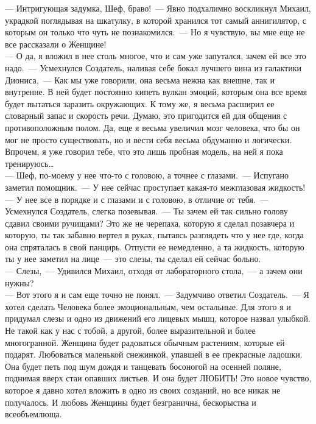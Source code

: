 --- Интригующая задумка, Шеф, браво!~--- Явно подхалимно воскликнул Михаил, 
украдкой поглядывая на шкатулку, в которой хранился тот самый 
аннигилятор, с которым он только что чуть не познакомился.~--- Но я 
чувствую, вы мне еще не все рассказали о Женщине!\\
--- О да, я вложил в нее столь многое, что и сам уже запутался, зачем 
ей все это надо.~--- Усмехнулся Создатель, наливая себе бокал лучшего вина
из галактики Диониса,~--- Как мы уже говорили, она весьма нежна как 
внешне, так и внутренне. В ней будет постоянно кипеть вулкан эмоций, 
которым она все время будет пытаться заразить окружающих. К тому же, я 
весьма расширил ее словарный запас и скорость речи. Думаю, это 
пригодится ей для общения с противоположным полом. Да, еще я весьма 
увеличил мозг человека, что бы он мог не просто существовать, но и вести
себя весьма обдуманно и логически. Впрочем, я уже говорил тебе, что это
лишь пробная модель, на ней я пока тренируюсь\ldots\\
--- Шеф, по-моему у нее что-то с головою, а точнее с глазами.~--- 
Испугано заметил помощник.~--- У нее сейчас проступает какая-то 
межглазовая жидкость!\\ --- У нее все в порядке и с глазами и с головою, в 
отличие от тебя.~--- Усмехнулся Создатель, слегка позевывая.~--- Ты зачем ей
так сильно голову сдавил своими ручищами? Это же не черепаха, которую я
сделал позавчера и которую, ты так забавно вертел в руках, пытаясь 
разглядеть что у нее где, когда она спряталась в свой панцирь. Отпусти 
ее немедленно, а та жидкость, которую ты у нее заметил на лице~--- это 
слезы, ты сделал ей сейчас больно.\\
--- Слезы,~--- Удивился Михаил, отходя 
от лабораторного стола,~--- а зачем они нужны?\\
--- Вот этого я и сам еще 
точно не понял.~--- Задумчиво ответил Создатель.~--- Я хотел сделать 
Человека более эмоциональным, чем остальные. Для этого я и придумал 
слезы и одно из движений его лицевых мышц, которое назвал улыбкой. Не 
такой как у нас с тобой, а другой, более выразительной и более 
многогранной. Женщина будет радоваться обычным растениям, которые ей 
подарят. Любоваться маленькой снежинкой, упавшей в ее прекрасные 
ладошки. Она будет петь под шум дождя и танцевать босоногой на осенней 
поляне, поднимая вверх стаи опавших листьев. И она будет ЛЮБИТЬ! Это 
новое чувство, которое я давно хотел вложить в одно из своих созданий, 
но все никак не получалось. И любовь Женщины будет безгранична, 
бескорыстна и всеобъемлюща. \\
